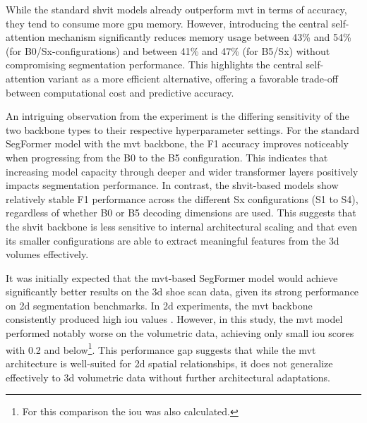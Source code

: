 \medskip

While the standard \gls{shvit} models already outperform \gls{mvt} in terms of accuracy, they tend to consume more \acrshort{gpu} memory. However, introducing the central self-attention mechanism significantly reduces memory usage between 43\% and 54\% (for B0/Sx-configurations) and between 41\% and 47\% (for B5/Sx) without compromising segmentation performance. This highlights the central self-attention variant as a more efficient alternative, offering a favorable trade-off between computational cost and predictive accuracy.

\medskip

An intriguing observation from the experiment is the differing sensitivity of the two backbone types to their respective hyperparameter settings. For the standard SegFormer model with the \gls{mvt} backbone, the F1 accuracy improves noticeably when progressing from the B0 to the B5 configuration. This indicates that increasing model capacity through deeper and wider transformer layers positively impacts segmentation performance. In contrast, the \gls{shvit}-based models show relatively stable F1 performance across the different Sx configurations (S1 to S4), regardless of whether B0 or B5 decoding dimensions are used. This suggests that the \gls{shvit} backbone is less sensitive to internal architectural scaling and that even its smaller configurations are able to extract meaningful features from the \gls{3d} volumes effectively.

\medskip

It was initially expected that the \gls{mvt}-based SegFormer model would achieve significantly better results on the \gls{3d} shoe scan data, given its strong performance on \gls{2d} segmentation benchmarks. In \gls{2d} experiments, the \gls{mvt} backbone consistently produced high \gls{iou} values \cite{xie2021segformersimpleefficientdesign}. However, in this study, the \gls{mvt} model performed notably worse on the volumetric data, achieving only small \gls{iou} scores with 0.2 and below\footnote{For this comparison the \gls{iou} was also calculated.}. This performance gap suggests that while the \gls{mvt} architecture is well-suited for \gls{2d} spatial relationships, it does not generalize effectively to \gls{3d} volumetric data without further architectural adaptations.

\bigskip

